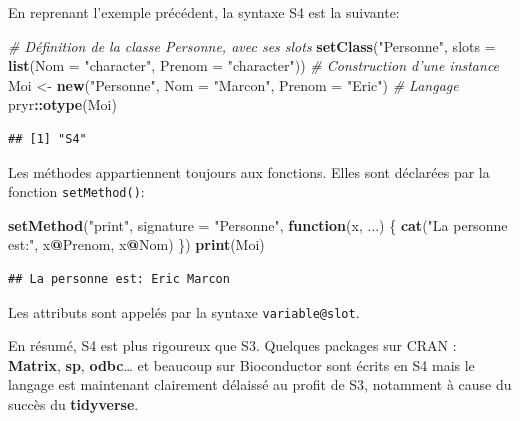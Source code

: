 \documentclass[
  12pt,
  french,
  a4paper,
  extrafontsizes,onecolumn,openright
  ]{memoir}
\newenvironment{Shaded}{\begin{snugshade}}{\end{snugshade}}
\newcommand{\CommentTok}[1]{\textcolor[rgb]{0.56,0.35,0.01}{\textit{#1}}}
\newcommand{\ControlFlowTok}[1]{\textcolor[rgb]{0.13,0.29,0.53}{\textbf{#1}}}
\newcommand{\DataTypeTok}[1]{\textcolor[rgb]{0.13,0.29,0.53}{#1}}
\newcommand{\KeywordTok}[1]{\textcolor[rgb]{0.13,0.29,0.53}{\textbf{#1}}}
\newcommand{\NormalTok}[1]{#1}
\newcommand{\OperatorTok}[1]{\textcolor[rgb]{0.81,0.36,0.00}{\textbf{#1}}}
\newcommand{\StringTok}[1]{\textcolor[rgb]{0.31,0.60,0.02}{#1}}
\begin{document}
En reprenant l'exemple précédent, la syntaxe S4 est la suivante:

\scriptsize

\begin{Shaded}
\begin{Highlighting}[]
\CommentTok{# Définition de la classe Personne, avec ses slots}
\KeywordTok{setClass}\NormalTok{(}\StringTok{"Personne"}\NormalTok{,  }
         \DataTypeTok{slots =} \KeywordTok{list}\NormalTok{(}\DataTypeTok{Nom =} \StringTok{"character"}\NormalTok{, }\DataTypeTok{Prenom =} \StringTok{"character"}\NormalTok{))}
\CommentTok{# Construction d'une instance}
\NormalTok{Moi <-}\StringTok{ }\KeywordTok{new}\NormalTok{(}\StringTok{"Personne"}\NormalTok{, }\DataTypeTok{Nom =} \StringTok{"Marcon"}\NormalTok{, }\DataTypeTok{Prenom =} \StringTok{"Eric"}\NormalTok{)}
\CommentTok{# Langage}
\NormalTok{pryr}\OperatorTok{::}\KeywordTok{otype}\NormalTok{(Moi)}
\end{Highlighting}
\end{Shaded}

\begin{verbatim}
## [1] "S4"
\end{verbatim}

\normalsize

Les méthodes appartiennent toujours aux fonctions.
Elles sont déclarées par la fonction \texttt{setMethod()}:

\scriptsize

\begin{Shaded}
\begin{Highlighting}[]
\KeywordTok{setMethod}\NormalTok{(}\StringTok{"print"}\NormalTok{, }\DataTypeTok{signature =} \StringTok{"Personne"}\NormalTok{, }\ControlFlowTok{function}\NormalTok{(x, ...) \{}
    \KeywordTok{cat}\NormalTok{(}\StringTok{"La personne est:"}\NormalTok{, x}\OperatorTok{@}\NormalTok{Prenom, x}\OperatorTok{@}\NormalTok{Nom)}
\NormalTok{\})}
\KeywordTok{print}\NormalTok{(Moi)}
\end{Highlighting}
\end{Shaded}

\begin{verbatim}
## La personne est: Eric Marcon
\end{verbatim}

\normalsize

Les attributs sont appelés par la syntaxe \texttt{variable@slot}.

En résumé, S4 est plus rigoureux que S3.
Quelques packages sur CRAN : \textbf{Matrix}, \textbf{sp}, \textbf{odbc}\ldots{} et beaucoup sur Bioconductor sont écrits en S4 mais le langage est maintenant clairement délaissé au profit de S3, notamment à cause du succès du \textbf{tidyverse}.
\end{document}
